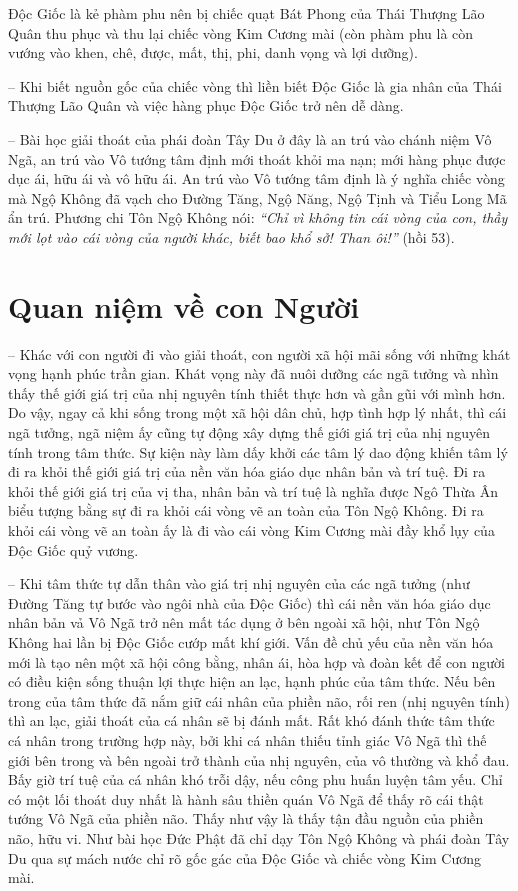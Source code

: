 Độc Giốc là kẻ phàm phu nên bị chiếc quạt Bát Phong của Thái Thượng Lão Quân thu phục và thu lại chiếc vòng Kim Cương mài (còn phàm phu là còn vướng vào khen, chê, được, mất, thị, phi, danh vọng và lợi dưỡng).

-- Khi biết nguồn gốc của chiếc vòng thì liền biết Độc Giốc là gia nhân của Thái Thượng Lão Quân và việc hàng phục Độc Giốc trở nên dễ dàng.

-- Bài học giải thoát của phái đoàn Tây Du ở đây là an trú vào chánh niệm Vô Ngã, an trú vào Vô tướng tâm định mới thoát khỏi ma nạn; mới hàng phục được dục ái, hữu ái và vô hữu ái. An trú vào Vô tướng tâm định là ý nghĩa chiếc vòng mà Ngộ Không đã vạch cho Đường Tăng, Ngộ Năng, Ngộ Tịnh và Tiểu Long Mã ẩn trú. Phương chi Tôn Ngộ Không nói: \emph{``Chỉ vì không tin cái vòng của con, thầy mới lọt vào cái vòng của người khác, biết bao khổ sở! Than ôi!''} (hồi 53).

\section{Quan niệm về con Người} %
\label{sec:50_51_con_nguoi}

-- Khác với con người đi vào giải thoát, con người xã hội mãi sống với những khát vọng hạnh phúc trần gian. Khát vọng này đã nuôi dưỡng các ngã tưởng và nhìn thấy thế giới giá trị của nhị nguyên tính thiết thực hơn và gần gũi với mình hơn. Do vậy, ngay cả khi sống trong một xã hội dân chủ, hợp tình hợp lý nhất, thì cái ngã tưởng, ngã niệm ấy cũng tự động xây dựng thế giới giá trị của nhị nguyên tính trong tâm thức. Sự kiện này làm dấy khởi các tâm lý dao động khiến tâm lý đi ra khỏi thế giới giá trị của nền văn hóa giáo dục nhân bản và trí tuệ. Đi ra khỏi thế giới giá trị của vị tha, nhân bản và trí tuệ là nghĩa được Ngô Thừa Ân biểu tượng bằng sự đi ra khỏi cái vòng vẽ an toàn của Tôn Ngộ Không. Đi ra khỏi cái vòng vẽ an toàn ấy là đi vào cái vòng Kim Cương mài đầy khổ lụy của Độc Giốc quỷ vương.

-- Khi tâm thức tự dẫn thân vào giá trị nhị nguyên của các ngã tưởng (như Đường Tăng tự bước vào ngôi nhà của Độc Giốc) thì cái nền văn hóa giáo dục nhân bản vả Vô Ngã trở nên mất tác dụng ở bên ngoài xã hội, như Tôn Ngộ Không hai lần bị Độc Giốc cướp mất khí giới. Vấn đề chủ yếu của nền văn hóa mới là tạo nên một xã hội công bằng, nhân ái, hòa hợp và đoàn kết để con người có điều kiện sống thuận lợi thực hiện an lạc, hạnh phúc của tâm thức. Nếu bên trong của tâm thức đã nắm giữ cái nhân của phiền não, rối ren (nhị nguyên tính) thì an lạc, giải thoát của cá nhân sẽ bị đánh mất. Rất khó đánh thức tâm thức cá nhân trong trường hợp này, bởi khi cá nhân thiếu tỉnh giác Vô Ngã thì thế giới bên trong và bên ngoài trở thành của nhị nguyên, của vô thường và khổ đau. Bấy giờ trí tuệ của cá nhân khó trỗi dậy, nếu công phu huấn luyện tâm yếu. Chỉ có một lối thoát duy nhất là hành sâu thiền quán Vô Ngã để thấy rõ cái thật tướng Vô Ngã của phiền não. Thấy như vậy là thấy tận đầu nguồn của phiền não, hữu vi. Như bài học Đức Phật đã chỉ dạy Tôn Ngộ Không và phái đoàn Tây Du qua sự mách nước chỉ rõ gốc gác của Độc Giốc và chiếc vòng Kim Cương mài.

